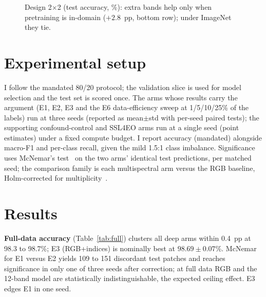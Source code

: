 \documentclass[11pt,a4paper]{article}
\begin{document}
\begin{figure}[ht]
\centering
{}
\caption{Design 2$\times$2 (test accuracy, \%): extra bands help only when
pretraining is in-domain ($+2.8$~pp, bottom row); under ImageNet they tie.}
\label{fig:design}
\end{figure}

\section{Experimental setup}
I follow the mandated 80/20 protocol; the validation slice is used for model
selection and the test set is scored once. The arms whose results carry the
argument (E1, E2, E3 and the E6 data-efficiency sweep at 1/5/10/25\% of the
labels) run at three seeds (reported as mean$\pm$std with per-seed paired
tests); the supporting confound-control and SSL4EO arms run at a single seed
(point estimates) under a fixed compute budget. I report accuracy (mandated)
alongside macro-F1 and per-class recall, given the mild 1.5:1 class imbalance.
Significance uses McNemar's test~\cite{dietterich1998} on the two arms' identical
test predictions, per matched seed; the comparison family is each multispectral
arm versus the RGB baseline, Holm-corrected for multiplicity~\cite{demsar2006}.

\section{Results}
\textbf{Full-data accuracy} (Table~\ref{tab:full}) clusters all deep arms within
0.4~pp at 98.3 to 98.7\%; E3 (RGB+indices) is nominally best at
$98.69\pm0.07$\%. McNemar for E1 versus E2 yields 109 to 151 discordant test
patches and reaches significance in only one of three seeds after correction; at
full data RGB and the 12-band model are statistically indistinguishable, the
expected ceiling effect. E3 edges E1 in one seed.
\end{document}
